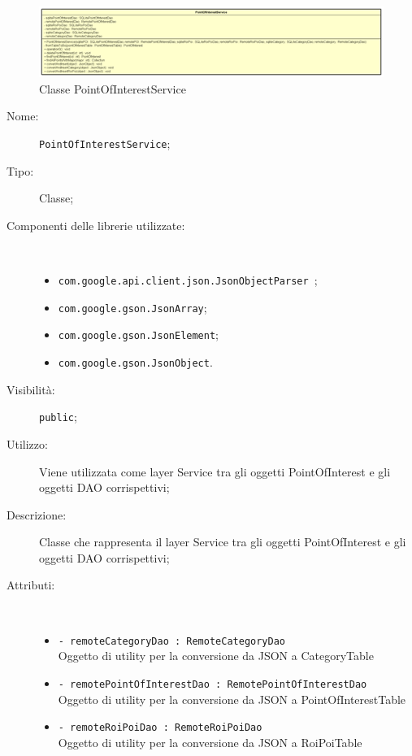\documentclass[../DefinizioneDiProdotto.tex]{subfiles}
\begin{document}
    \begin{figure}[H]
        \centering
        \includegraphics{img/PointOfInterestService.png}
        \caption{Classe PointOfInterestService}\label{fig:model::dataaccess::service::PointOfInterestService} 
    \end{figure}
    \begin{description}
\item[Nome:] \texttt{PointOfInterestService};
\item[Tipo:] Classe;
\item[Componenti delle librerie utilizzate:] \
\begin{itemize}
\item \texttt{com.google.api.client.json.JsonObjectParser
};

\item \texttt{com.google.gson.JsonArray};

\item \texttt{com.google.gson.JsonElement};

\item \texttt{com.google.gson.JsonObject}.

\end{itemize}
\item[Visibilità:] \texttt{public};
\item[Utilizzo:] Viene utilizzata come layer Service tra gli oggetti PointOfInterest e gli oggetti DAO corrispettivi;
\item[Descrizione:] Classe che rappresenta il layer Service tra gli oggetti PointOfInterest e gli oggetti DAO corrispettivi;
\item[Attributi:] \
\begin{itemize}
\item \texttt{- remoteCategoryDao : RemoteCategoryDao}\\
Oggetto di utility per la conversione da JSON a CategoryTable

\item \texttt{- remotePointOfInterestDao : RemotePointOfInterestDao}\\
Oggetto di utility per la conversione da JSON a PointOfInterestTable

\item \texttt{- remoteRoiPoiDao : RemoteRoiPoiDao}\\
Oggetto di utility per la conversione da JSON a RoiPoiTable


\end{itemize}
\end{description}
\end{document}
